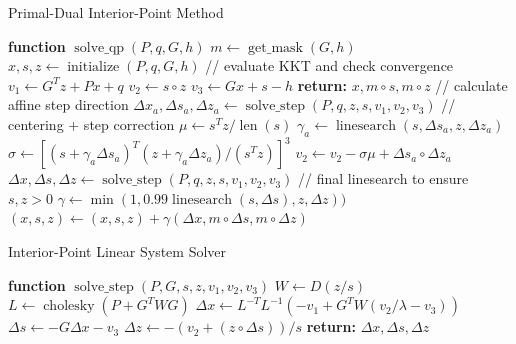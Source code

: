 \begin{algorithm}
\caption{Primal-Dual Interior-Point Method}\label{pdip}
\begin{algorithmic}[1]
\State \textbf{function} $\operatorname{solve\_qp}(P,q,G,h)$ %
\State $m \gets \operatorname{get\_mask}(G, h)$ 
\State $x, s, z \gets \operatorname{initialize}(P, q, G, h)$ 
\State // evaluate KKT and check convergence
\State $v_1 \gets G^Tz + Px + q$ 
\State $v_2 \gets s \circ z$ 
\State $v_3 \gets Gx + s - h$ 
\State \textbf{return:} $x, m \circ s, m \circ z$
\EndIf 
\State 
\State // calculate affine step direction
\State $\Delta x_a, \Delta s_a, \Delta z_a \gets \operatorname{solve\_step}(P,q, z, s, v_1, v_2, v_3)$
\State 
\State // centering + step correction
\State $\mu \gets s^Tz/\operatorname{len}(s)$
\State $\gamma_a\gets \operatorname{linesearch}(s, \Delta s_a, z, \Delta z_a)$ \Comment{\eqref{eq:linesearch}}
\State $\sigma \gets [(s + \gamma_a \Delta s_a)^T(z + \gamma_a \Delta z_a)/(s^Tz)]^3$
\State $v_2 \gets v_2 - \sigma \mu + \Delta s_a \circ \Delta z_a$
\State $\Delta x, \Delta s, \Delta z \gets \operatorname{solve\_step}(P,q, z, s, v_1, v_2, v_3)$
\State 
\State // final linesearch to ensure $s, z > 0$
\State $\gamma \gets \operatorname{min}(1, 0.99 \operatorname{linesearch}(s, \Delta s), z, \Delta z))$ \Comment{\eqref{eq:linesearch}}
\State $(x, s, z) \gets (x, s, z) + \gamma (\Delta x, m \circ \Delta s, m \circ \Delta z)$
\EndFor
\end{algorithmic}
\end{algorithm}
%
%
\begin{algorithm}
\caption{Interior-Point Linear System Solver}\label{pdip_step_solve}
\begin{algorithmic}[1]
\State \textbf{function} $\operatorname{solve\_step}(P,G,s, z,v_1,v_2,v_3)$ %
\State $W \gets D(z / s)$ 
\State $L \gets \operatorname{cholesky}(P + G^TWG)$ 
\State $\Delta x \gets L^{-T}L^{-1}(-v_1 + G^TW(v_2/\lambda - v_3))$
\State $\Delta s \gets -G\Delta x - v_3$
\State $\Delta z \gets -(v_2 + (z \circ \Delta s)) / s$
\State \textbf{return:} $\Delta x, \Delta s, \Delta z$
\end{algorithmic}
\end{algorithm}
%
%
